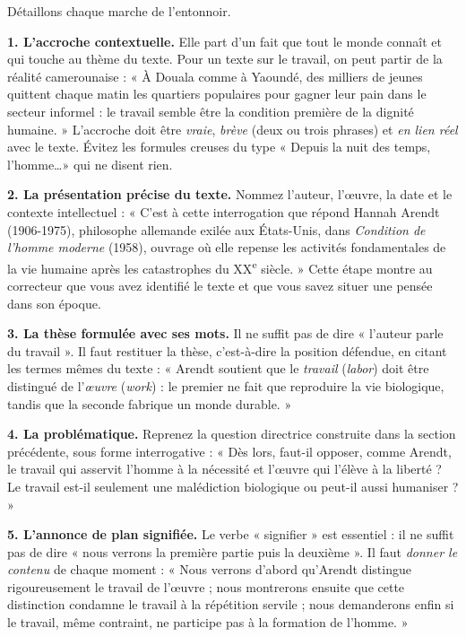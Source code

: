 \documentclass[11pt]{article}
\newcommand{\cle}[1]{{\popxbold\color{popdark}#1}}
\begin{document}
Détaillons chaque marche de l'entonnoir.

\textbf{1. L'accroche contextuelle.} Elle part d'un fait que tout le monde connaît et qui touche au thème du texte. Pour un texte sur le travail, on peut partir de la réalité camerounaise : « À Douala comme à Yaoundé, des milliers de jeunes quittent chaque matin les quartiers populaires pour gagner leur pain dans le secteur informel : le travail semble être la condition première de la dignité humaine. » L'accroche doit être \emph{vraie}, \emph{brève} (deux ou trois phrases) et \emph{en lien réel} avec le texte. Évitez les formules creuses du type « Depuis la nuit des temps, l'homme\ldots » qui ne disent rien.

\textbf{2. La présentation précise du texte.} Nommez l'auteur, l'\oe uvre, la date et le contexte intellectuel : « C'est à cette interrogation que répond Hannah Arendt (1906-1975), philosophe allemande exilée aux États-Unis, dans \emph{Condition de l'homme moderne} (1958), ouvrage où elle repense les activités fondamentales de la vie humaine après les catastrophes du XX\textsuperscript{e} siècle. » Cette étape montre au correcteur que vous avez identifié le texte et que vous savez situer une pensée dans son époque.

\textbf{3. La thèse formulée avec ses mots.} Il ne suffit pas de dire « l'auteur parle du travail ». Il faut restituer la \cle{thèse}, c'est-à-dire la position défendue, en citant les termes mêmes du texte : « Arendt soutient que le \emph{travail} (\emph{labor}) doit être distingué de l'\emph{\oe uvre} (\emph{work}) : le premier ne fait que reproduire la vie biologique, tandis que la seconde fabrique un monde durable. »

\textbf{4. La problématique.} Reprenez la question directrice construite dans la section précédente, sous forme interrogative : « Dès lors, faut-il opposer, comme Arendt, le travail qui asservit l'homme à la nécessité et l'\oe uvre qui l'élève à la liberté ? Le travail est-il seulement une malédiction biologique ou peut-il aussi humaniser ? »

\textbf{5. L'annonce de plan signifiée.} Le verbe « signifier » est essentiel : il ne suffit pas de dire « nous verrons la première partie puis la deuxième ». Il faut \emph{donner le contenu} de chaque moment : « Nous verrons d'abord qu'Arendt distingue rigoureusement le travail de l'\oe uvre ; nous montrerons ensuite que cette distinction condamne le travail à la répétition servile ; nous demanderons enfin si le travail, même contraint, ne participe pas à la formation de l'homme. »
\end{document}
